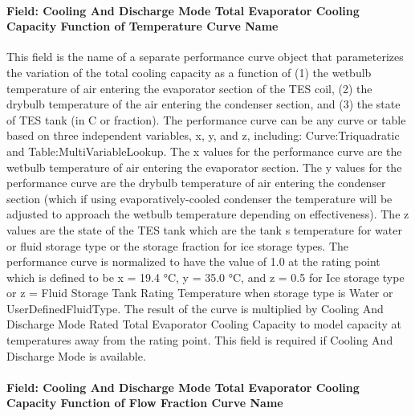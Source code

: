 \paragraph{Field: Cooling And Discharge Mode Total Evaporator Cooling Capacity Function of Temperature Curve Name}\label{field-cooling-and-discharge-mode-total-evaporator-cooling-capacity-function-of-temperature-curve-name}

This field is the name of a separate performance curve object that parameterizes the variation of the total cooling capacity as a function of (1) the wetbulb temperature of air entering the evaporator section of the TES coil, (2) the drybulb temperature of the air entering the condenser section, and (3) the state of TES tank (in C or fraction). The performance curve can be any curve or table based on three independent variables, x, y, and z, including: Curve:Triquadratic and Table:MultiVariableLookup. The x values for the performance curve are the wetbulb temperature of air entering the evaporator section. The y values for the performance curve are the drybulb temperature of air entering the condenser section (which if using evaporatively-cooled condenser the temperature will be adjusted to approach the wetbulb temperature depending on effectiveness). The z values are the state of the TES tank which are the tank s temperature for water or fluid storage type or the storage fraction for ice storage types. The performance curve is normalized to have the value of 1.0 at the rating point which is defined to be x = 19.4 °C, y = 35.0 °C, and z = 0.5 for Ice storage type or z = Fluid Storage Tank Rating Temperature when storage type is Water or UserDefinedFluidType. The result of the curve is multiplied by Cooling And Discharge Mode Rated Total Evaporator Cooling Capacity to model capacity at temperatures away from the rating point. This field is required if Cooling And Discharge Mode is available.

\paragraph{Field: Cooling And Discharge Mode Total Evaporator Cooling Capacity Function of Flow Fraction Curve Name}\label{field-cooling-and-discharge-mode-total-evaporator-cooling-capacity-function-of-flow-fraction-curve-name}

